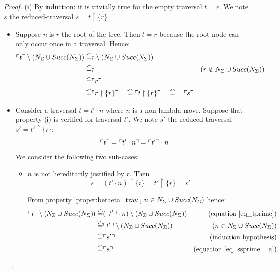 \begin{proof}
(i) By induction: it is trivially true for the empty traversal $t =
\epsilon$. We note $s$ the reduced-traversal $s = t \upharpoonright
\{ r \}$
\begin{itemize}
\item Suppose $n$ is $r$ the root of the tree. Then $t = r$ because the root node can only occur once in a traversal. Hence:
    \begin{eqnarray*}
    \ulcorner t \urcorner \setminus \left( N_\Sigma \cup Succ(N_\Sigma) \right)
    \stackrel{\curvearrowleft}{=}& r \setminus \left( N_\Sigma \cup Succ(N_\Sigma) \right) \\
    \stackrel{\curvearrowleft}{=}& r  & (r \notin N_\Sigma \cup Succ(N_\Sigma))  \\
    \stackrel{\curvearrowleft}{=}& \ulcorner r \urcorner \\
    \stackrel{\curvearrowleft}{=}& \ulcorner r  \upharpoonright \{ r \} \urcorner \quad
    \stackrel{\curvearrowleft}{=} \ulcorner t  \upharpoonright \{ r \} \urcorner \quad
    \stackrel{\curvearrowleft}{=} \quad \ulcorner s \urcorner
    \end{eqnarray*}

\item Consider a traversal $t = t' \cdot n$ where $n$ is a non-lambda
move. Suppose that property (i) is verified for traversal $t'$. We
note $s'$ the reduced-traversal $s' = t' \upharpoonright \{ r \}$:
    \begin{equation}
    \ulcorner t \urcorner = \ulcorner t' \cdot n \urcorner = \ulcorner t' \urcorner \cdot n  \label{eq_tprime}
    \end{equation}

    We consider the following two sub-cases:
    \begin{itemize}
    \item $n$ is not hereditarily justified by $r$. Then
    \begin{equation}
    s = (t' \cdot n) \upharpoonright \{ r \} = t' \upharpoonright \{ r \} = s' \label{eq_ssprime_1a}
    \end{equation}

    From property \ref{proper:betaeta_trav}, $n \in N_\Sigma \cup Succ(N_\Sigma)$ hence:
    \begin{eqnarray*}
    \ulcorner t \urcorner \setminus \left( N_\Sigma \cup Succ(N_\Sigma) \right)
    \stackrel{\curvearrowleft}{=}& (\ulcorner t' \urcorner \cdot n) \setminus \left( N_\Sigma \cup Succ(N_\Sigma) \right) & \mbox{(equation \ref{eq_tprime})} \\
    \stackrel{\curvearrowleft}{=}& \ulcorner t' \urcorner \setminus \left( N_\Sigma \cup Succ(N_\Sigma) \right) & (n \in N_\Sigma \cup Succ(N_\Sigma)) \\
    \stackrel{\curvearrowleft}{=}& \ulcorner s' \urcorner & \mbox{(induction hypothesis)} \\
    \stackrel{\curvearrowleft}{=}& \ulcorner s \urcorner & \mbox{(equation \ref{eq_ssprime_1a})}
    \end{eqnarray*}


\end{itemize}
\end{itemize}
\end{proof}
